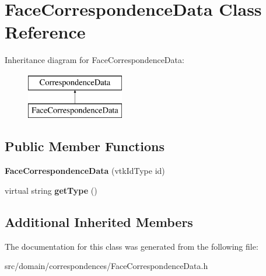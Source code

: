 \hypertarget{class_face_correspondence_data}{}\section{Face\+Correspondence\+Data Class Reference}
\label{class_face_correspondence_data}
Inheritance diagram for Face\+Correspondence\+Data\+:\begin{figure}[H]
\begin{center}
\leavevmode
\includegraphics[height=2.000000cm]{class_face_correspondence_data}
\end{center}
\end{figure}
\subsection*{Public Member Functions}
\begin{DoxyCompactItemize}
\item 
\hypertarget{class_face_correspondence_data_a4890aed4edbf7842c051b121c30135bd}{}{\bfseries Face\+Correspondence\+Data} (vtk\+Id\+Type id)\label{class_face_correspondence_data_a4890aed4edbf7842c051b121c30135bd}

\item 
\hypertarget{class_face_correspondence_data_abd6ce7468457b56e5e093915591a1b17}{}virtual string {\bfseries get\+Type} ()\label{class_face_correspondence_data_abd6ce7468457b56e5e093915591a1b17}

\end{DoxyCompactItemize}
\subsection*{Additional Inherited Members}


The documentation for this class was generated from the following file\+:\begin{DoxyCompactItemize}
\item 
src/domain/correspondences/Face\+Correspondence\+Data.\+h\end{DoxyCompactItemize}
